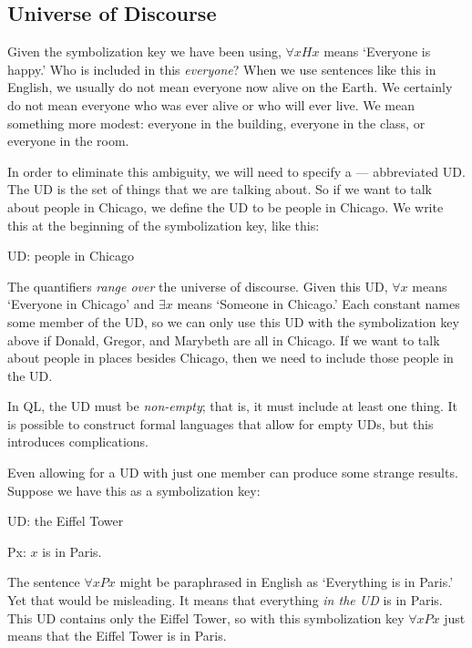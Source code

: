 \subsection{Universe of Discourse}
Given the symbolization key we have been using, $\forall xHx$ means `Everyone is happy.' Who is included in this \emph{everyone}? When we use sentences like this in English, we usually do not mean everyone now alive on the Earth. We certainly do not mean everyone who was ever alive or who will ever live. We mean something more modest: everyone in the building, everyone in the class, or everyone in the room.

In order to eliminate this ambiguity, we will need to specify a --- abbreviated UD. The UD is the set of things that we are talking about. So if we want to talk about people in Chicago, we define the UD to be people in Chicago. We write this at the beginning of the symbolization key, like this:
\begin{ekey}
\item[UD:] people in Chicago
\end{ekey}
The quantifiers \emph{range over} the universe of discourse. Given this UD, $\forall x$ means `Everyone in Chicago' and $\exists x$ means `Someone in Chicago.' Each constant names some member of the UD, so we can only use this UD with the symbolization key above if Donald, Gregor, and Marybeth are all in Chicago. If we want to talk about people in places besides Chicago, then we need to include those people in the UD.


In QL, the UD must be \emph{non-empty}; that is, it must include at least one thing. It is possible to construct formal languages that allow for empty UDs, but this introduces complications.

Even allowing for a UD with just one member can produce some strange results. Suppose we have this as a symbolization key:
\begin{ekey}
\item[UD:] the Eiffel Tower
\item[Px:] $x$ is in Paris.
\end{ekey}
The sentence $\forall x Px$ might be paraphrased in English as `Everything is in Paris.' Yet that would be misleading. It means that everything \emph{in the UD} is in Paris. This UD contains only the Eiffel Tower, so with this symbolization key $\forall x Px$ just means that the Eiffel Tower is in Paris.



